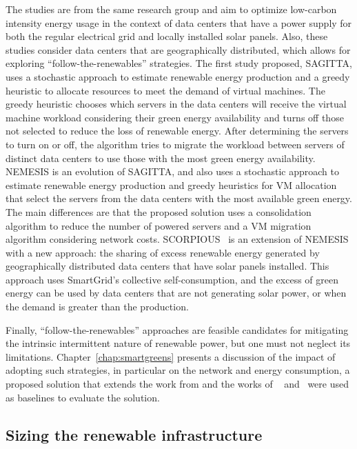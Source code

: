 The studies \citet{SAGITTA,NEMESIS,SCORPIOUS} are from the same research group and aim to optimize low-carbon intensity energy usage in the context of data centers that have a power supply for both the regular electrical grid and locally installed solar panels. Also, these studies consider data centers that are geographically distributed, which allows for exploring ``follow-the-renewables'' strategies. The first study proposed, SAGITTA\citep{SAGITTA}, uses a stochastic approach to estimate renewable energy production and a greedy heuristic to allocate resources to meet the demand of virtual machines. The greedy heuristic chooses which servers in the data centers will receive the virtual machine workload considering their green energy availability and turns off those not selected to reduce the loss of renewable energy. After determining the servers to turn on or off, the algorithm tries to migrate the workload between servers of distinct data centers to use those with the most green energy availability. NEMESIS\citep{NEMESIS} is an evolution of SAGITTA, and also uses a stochastic approach to estimate renewable energy production and greedy heuristics for VM allocation that select the servers from the data centers with the most available green energy. The main differences are that the proposed solution uses a consolidation algorithm to reduce the number of powered servers and a VM migration algorithm considering network costs. SCORPIOUS~\citep{SCORPIOUS} is an extension of NEMESIS  with a new approach: the sharing of excess renewable energy generated by geographically distributed data centers that have solar panels installed. This approach uses SmartGrid's collective self-consumption, and the excess of green energy can be used by data centers that are not generating solar power, or when the demand is greater than the production.

Finally, ``follow-the-renewables'' approaches are feasible candidates for mitigating the intrinsic intermittent nature of renewable power, but one must not neglect its limitations. Chapter~\ref{chap:smartgreens} presents a discussion of the impact of adopting such strategies, in particular on the network and energy consumption, a proposed solution that extends the work from \citet{NEMESIS} and the works of ~\citet{XU2020191} and~\citet{ALI2021110907} were used as baselines to evaluate the solution.


\subsection{Sizing the renewable infrastructure}


